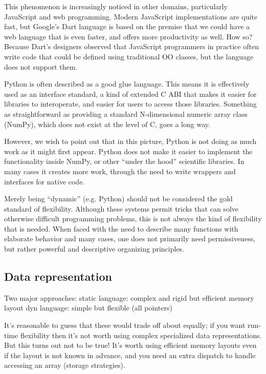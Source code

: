 {This phenomenon is increasingly noticed in other domains, particularly
JavaScript and web programming. Modern JavaScript implementations are
quite fast, but Google's Dart language is based on the premise that
we could have a web language that is even faster, and offers more
productivity as well. How so? Because Dart's designers observed that
JavaScript programmers in practice often write code that could be
defined using traditional OO classes, but the language does not
support them.

Python is often described as a good glue language. This
means it is effectively used as an interface standard, a kind of
extended C ABI that makes it easier for libraries to interoperate,
and easier for users to access those libraries. Something as straightforward
as providing a standard N-dimensional numeric array class (NumPy),
which does not exist at the level of C, goes a long way.

However, we wish to point out that in this picture, Python is not
doing as much work as it might first appear. Python does not make
it easier to implement the functionality inside NumPy, or other
``under the hood'' scientific libraries. In many cases it creates
more work, through the need to write wrappers and interfaces
for native code.

Merely being ``dynamic'' (e.g. Python) should not be considered
the gold standard of flexibility. Although these systems permit
tricks that can solve otherwise difficult programming problems,
this is not always the kind of flexibility that is needed.
When faced with the need to describe many functions with elaborate
behavior and many cases, one does not primarily need permissiveness,
but rather powerful and descriptive organizing principles.

\subsection{Data representation}

Two major approaches:
static language: complex and rigid but efficient memory layout
dyn language: simple but flexible (all pointers)

It's reasonable to guess that these would trade off about equally;
if you want run-time flexibility then it's not worth using complex
specialized data representations.
But this turns out not to be true! It's worth using efficient
memory layouts even if the layout is not known in advance, and you
need an extra dispatch to handle accessing an array (storage strategies).

}
